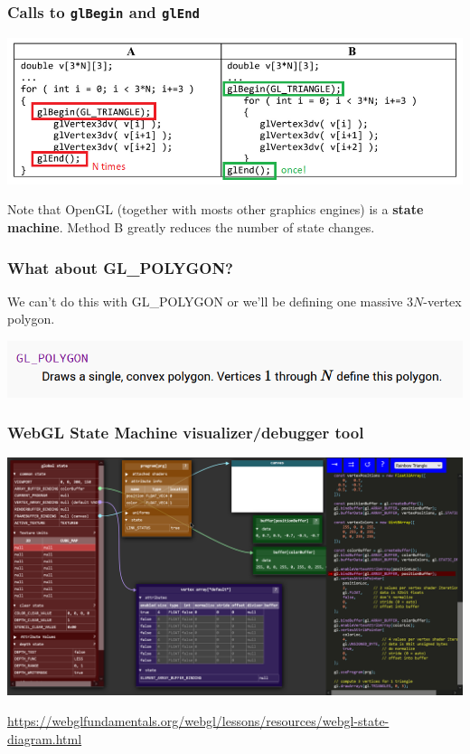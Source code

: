 \documentclass{beamer}
\begin{document}
\begin{frame}
    \frametitle{Calls to \texttt{glBegin} and \texttt{glEnd}}

    \begin{center}
        \includegraphics[scale=0.6]{q7-annot.png}
    \end{center}

    Note that OpenGL (together with mosts other graphics engines)
    is a \textbf{state machine}. Method B greatly reduces the number of state changes.

\end{frame}

\begin{frame}
    \frametitle{What about GL\_POLYGON?}

    We can't do this with GL\_POLYGON or we'll be defining one massive
    $3N$-vertex polygon.

    \begin{center}
        \includegraphics[scale=0.6]{gl-polygon.png}
    \end{center}

\end{frame}

\begin{frame}
    \frametitle{WebGL State Machine visualizer/debugger tool}

    \begin{center}
        \includegraphics[scale=0.2]{webgl-fsm.png}
    \end{center}

    \url{https://webglfundamentals.org/webgl/lessons/resources/webgl-state-diagram.html}

\end{frame}
\end{document}
